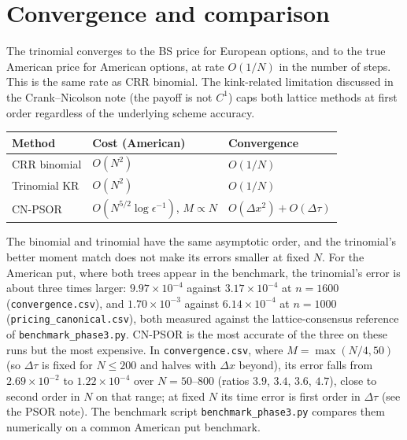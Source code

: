 \documentclass[11pt,a4paper]{article}
\begin{document}
\section{Convergence and comparison}

The trinomial converges to the BS price for European options, and
to the true American price for American options, at rate
$O(1/N)$ in the number of steps. This is the same rate as CRR
binomial. The kink-related limitation discussed in the Crank--Nicolson note (the
payoff is not $C^1$) caps both lattice methods at first order
regardless of the underlying scheme accuracy.

\begin{center}
\begin{tabular}{lll}
\hline
Method & Cost (American) & Convergence \\
\hline
CRR binomial         & $O(N^2)$ & $O(1/N)$ \\
Trinomial KR         & $O(N^2)$ & $O(1/N)$ \\
CN-PSOR              & $O(N^{5/2} \log\epsilon^{-1})$, $M \propto N$ & $O(\Delta x^2) + O(\Delta\tau)$ \\
\hline
\end{tabular}
\end{center}

The binomial and trinomial have the same asymptotic order, and the
trinomial's better moment match does not make its errors smaller at
fixed $N$. For the American put, where both trees appear in the
benchmark, the trinomial's error is about three times larger: $9.97\times10^{-4}$ against $3.17\times10^{-4}$ at
$n = 1600$ (\texttt{convergence.csv}), and $1.70\times10^{-3}$ against
$6.14\times10^{-4}$ at $n = 1000$ (\texttt{pricing\_canonical.csv}), both
measured against the lattice-consensus reference of
\texttt{benchmark\_phase3.py}. CN-PSOR is the most accurate of the three
on these runs but the most expensive. In \texttt{convergence.csv}, where
$M = \max(N/4, 50)$ (so $\Delta\tau$ is fixed for $N \le 200$ and halves
with $\Delta x$ beyond), its error falls from $2.69\times10^{-2}$ to
$1.22\times10^{-4}$ over $N = 50$--$800$ (ratios $3.9$, $3.4$, $3.6$,
$4.7$), close to second order in $N$ on that range; at fixed $N$ its
time error is first order in $\Delta\tau$ (see the PSOR note). The
benchmark script \texttt{benchmark\_phase3.py} compares them numerically
on a common American put benchmark.

\end{document}
